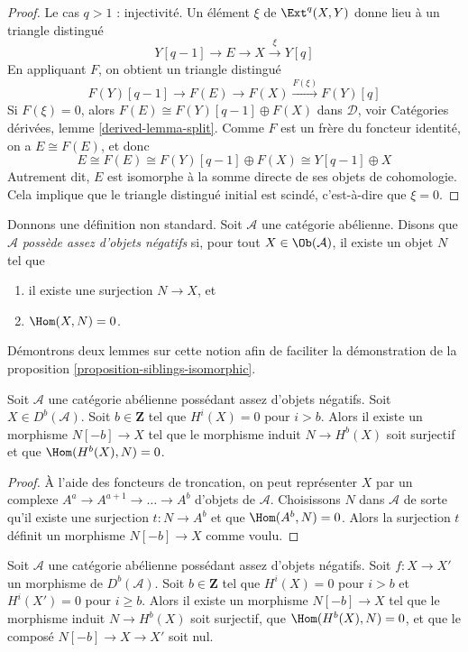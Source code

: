 \begin{proof}
\medskip\noindent
Le cas $q > 1$ : injectivité. Un élément $\xi$ de $\Ext^q(X, Y)$
donne lieu à un triangle distingué
$$
Y[q - 1] \to E \to X \xrightarrow{\xi} Y[q]
$$
En appliquant $F$, on obtient un triangle distingué
$$
F(Y)[q - 1] \to F(E) \to F(X) \xrightarrow{F(\xi)} F(Y)[q]
$$
Si $F(\xi) = 0$, alors $F(E) \cong F(Y)[q - 1] \oplus F(X)$
dans $\mathcal{D}$, voir
Catégories dérivées, lemme \ref{derived-lemma-split}.
Comme $F$ est un frère du foncteur identité, on a
$E \cong F(E)$, et donc
$$
E \cong F(E) \cong F(Y)[q - 1] \oplus F(X) \cong Y[q - 1] \oplus X
$$
Autrement dit, $E$ est isomorphe à la
somme directe de ses objets de cohomologie. Cela implique que le
triangle distingué initial est scindé, c'est-à-dire que $\xi = 0$.
\end{proof}

\noindent
Donnons une définition non standard. Soit $\mathcal{A}$ une catégorie
abélienne. Disons que $\mathcal{A}$ {\it possède assez d'objets négatifs}
si, pour tout $X \in \Ob(\mathcal{A})$, il existe un objet $N$ tel que
\begin{enumerate}
\item il existe une surjection $N \to X$, et
\item $\Hom(X, N) = 0$.
\end{enumerate}
Démontrons deux lemmes sur cette notion afin de faciliter
la démonstration de la proposition \ref{proposition-siblings-isomorphic}.

\begin{lemma}
\label{lemma-good-map}
Soit $\mathcal{A}$ une catégorie abélienne possédant assez d'objets négatifs.
Soit $X \in D^b(\mathcal{A})$. Soit $b \in \mathbf{Z}$ tel que
$H^i(X) = 0$ pour $i > b$. Alors
il existe un morphisme $N[-b] \to X$ tel que le morphisme induit
$N \to H^b(X)$ soit surjectif et que $\Hom(H^b(X), N) = 0$.
\end{lemma}

\begin{proof}
À l'aide des foncteurs de troncation, on peut représenter $X$ par un complexe
$A^a \to A^{a + 1} \to \ldots \to A^b$ d'objets de $\mathcal{A}$.
Choisissons $N$ dans $\mathcal{A}$ de sorte qu'il existe une surjection
$t : N \to A^b$ et que $\Hom(A^b, N) = 0$. Alors la surjection $t$
définit un morphisme $N[-b] \to X$ comme voulu.
\end{proof}

\begin{lemma}
\label{lemma-good-map-zero}
Soit $\mathcal{A}$ une catégorie abélienne possédant assez d'objets négatifs.
Soit $f : X \to X'$ un morphisme de $D^b(\mathcal{A})$. Soit $b \in \mathbf{Z}$
tel que $H^i(X) = 0$ pour $i > b$ et $H^i(X') = 0$ pour $i \geq b$.
Alors il existe un morphisme $N[-b] \to X$ tel que le morphisme induit
$N \to H^b(X)$ soit surjectif, que $\Hom(H^b(X), N) = 0$, et
que le composé $N[-b] \to X \to X'$ soit nul.
\end{lemma}

